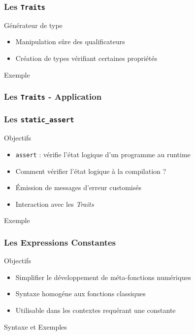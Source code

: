 \documentclass[svgnames]{beamer}
\begin{document}
\frame
{
  \frametitle{Les \texttt{Traits}}

  \begin{block}{Générateur de type}
  \begin{itemize}
  \item Manipulation s\^ure des qualificateurs
  \item Cr\'eation de types v\'erifiant certaines propri\'et\'es
  \end{itemize}
  \end{block}

  \begin{block}{Exemple}
  \end{block}
}

\frame
{
  \frametitle{Les \texttt{Traits} - Application}
}

\frame
{
  \frametitle{Les \texttt{static\_assert}}

  \begin{block}{Objectifs}
  \begin{itemize}
  \item \texttt{assert} : v\'erifie l'\'etat logique d'un programme au runtime
  \item Comment v\'erifier l'\'etat logique \`a la compilation ?
  \item \'Emission de messages d'erreur customis\'es
  \item Interaction avec les \textit{Traits}
  \end{itemize}
  \end{block}

  \begin{block}{Exemple}
  \end{block}
}

\frame
{
  \frametitle{Les Expressions Constantes}

  \begin{block}{Objectifs}
  \begin{itemize}
  \item Simplifier le développement de méta-fonctions numériques
  \item Syntaxe homogéne aux fonctions classiques
  \item Utilisable dans les contextes requérant une constante
  \end{itemize}
  \end{block}

  \begin{block}{Syntaxe et Exemples}
  \end{block}
}
\end{document}
